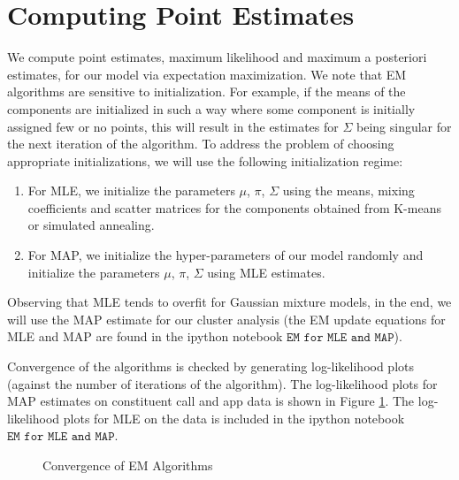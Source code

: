 \documentclass{article}
\theoremstyle{theorem}
\theoremstyle{theorem}
\theoremstyle{theorem}
\theoremstyle{lemma}
\theoremstyle{definition}
\theoremstyle{example}
\begin{document}
\section{Computing Point Estimates}
We compute point estimates, maximum likelihood and maximum a posteriori estimates, for our model via expectation maximization. We note that EM algorithms are sensitive to initialization. For example, if the means of the components are initialized in such a way where some component is initially assigned few or no points, this will result in the estimates for $\Sigma$ being singular for the next iteration of the algorithm. To address the problem of choosing appropriate initializations, we will use the following initialization regime:
\begin{enumerate}
\item For MLE, we initialize the parameters $\mu$, $\pi$, $\Sigma$ using the means, mixing coefficients and scatter matrices for the components obtained from K-means or simulated annealing. 
\item For MAP, we initialize the hyper-parameters of our model randomly and initialize the parameters $\mu$, $\pi$, $\Sigma$ using MLE estimates.
\end{enumerate}
Observing that MLE tends to overfit for Gaussian mixture models, in the end, we will use the MAP estimate for our cluster analysis (the EM update equations for MLE and MAP are found in the ipython notebook $\texttt{EM for MLE and MAP}$).

Convergence of the algorithms is checked by generating log-likelihood plots (against the number of iterations of the algorithm). The log-likelihood plots for MAP estimates on constituent call and app data is shown in Figure \ref{fig:conv}. The log-likelihood plots for MLE on the data is included in the ipython notebook $\texttt{EM for MLE and MAP}$. 
\begin{figure}[h!]
\begin{center}
\caption{Convergence of EM Algorithms}
\hskip1cm
\end{center}\label{fig:conv}
\vskip -0.2in
\end{figure} 
\end{document}
